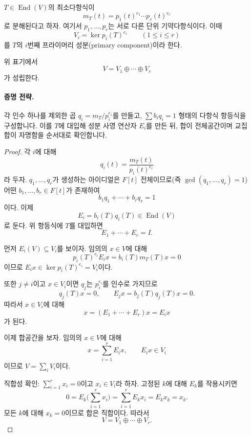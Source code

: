 
\begin{definition}
$T\in\operatorname{End}(V)$의 최소다항식이
\[
m_T(t)=p_1(t)^{e_1}\cdots p_r(t)^{e_r}
\]
로 분해된다고 하자. 여기서 $p_1,\dots,p_r$는 서로 다른 단위 기약다항식이다. 이때
\[
V_i=\ker p_i(T)^{e_i}\qquad (1\le i\le r)
\]
를 $T$의 $i$번째 프라이머리 성분(primary component)이라 한다.
\end{definition}

\begin{theorem}
위 표기에서
\[
V=V_1\oplus\cdots\oplus V_r
\]
가 성립한다.
\end{theorem}

\paragraph{증명 전략.}
각 인수 하나를 제외한 곱 $q_i=m_T/p_i^{e_i}$를 만들고, $\sum b_iq_i=1$ 형태의 다항식 항등식을 구성합니다. 이를 $T$에 대입해 성분 사영 연산자 $E_i$를 만든 뒤, 합이 전체공간이며 교집합이 자명함을 순서대로 확인합니다.

\begin{proof}
각 $i$에 대해
\[
q_i(t)=\frac{m_T(t)}{p_i(t)^{e_i}}
\]
라 두자. $q_1,\dots,q_r$가 생성하는 아이디얼은 $F[t]$ 전체이므로(즉 $\gcd(q_1,\dots,q_r)=1$) 어떤 $b_1,\dots,b_r\in F[t]$가 존재하여
\[
b_1q_1+\cdots+b_rq_r=1
\]
이다. 이제
\[
E_i=b_i(T)q_i(T)\in\operatorname{End}(V)
\]
로 둔다. 위 항등식에 $T$를 대입하면
\[
E_1+\cdots+E_r=I.
\]

먼저 $E_i(V)\subseteq V_i$를 보이자. 임의의 $x\in V$에 대해
\[
p_i(T)^{e_i}E_i x=b_i(T)m_T(T)x=0
\]
이므로 $E_i x\in\ker p_i(T)^{e_i}=V_i$이다.

또한 $j\ne i$이고 $x\in V_i$이면 $q_j$는 $p_i^{e_i}$를 인수로 가지므로
\[
q_j(T)x=0,\qquad E_jx=b_j(T)q_j(T)x=0.
\]
따라서 $x\in V_i$에 대해
\[
x=(E_1+\cdots+E_r)x=E_ix
\]
가 된다.

이제 합공간을 보자. 임의의 $x\in V$에 대해
\[
x=\sum_{i=1}^r E_i x,\qquad E_i x\in V_i
\]
이므로 $V=\sum_i V_i$이다.

직합성 확인: $\sum_{i=1}^r x_i=0$이고 $x_i\in V_i$라 하자. 고정된 $k$에 대해 $E_k$를 작용시키면
\[
0=E_k\Big(\sum_{i=1}^r x_i\Big)=\sum_{i=1}^r E_kx_i=E_kx_k=x_k.
\]
모든 $k$에 대해 $x_k=0$이므로 합은 직합이다. 따라서
\[
V=V_1\oplus\cdots\oplus V_r.
\]
\end{proof}

